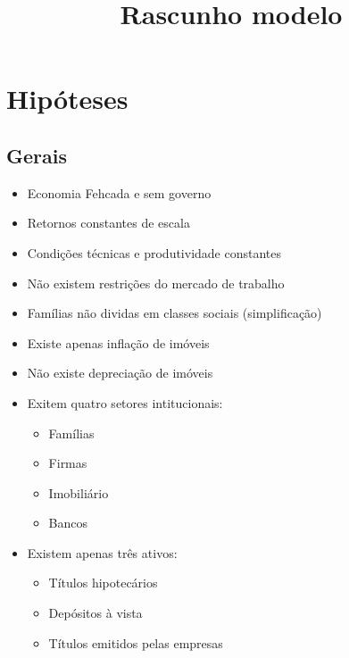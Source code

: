 \documentclass[11pt]{article}
\title{Rascunho modelo}
\providecommand{\tightlist}{%
      \setlength{\itemsep}{0pt}\setlength{\parskip}{0pt}}
\begin{document}
    
    
    \maketitle
    
    

    
    \hypertarget{hipuxf3teses}{%
\section{Hipóteses}\label{hipuxf3teses}}

    \hypertarget{gerais}{%
\subsection{Gerais}\label{gerais}}

\begin{itemize}
\tightlist
\item
  Economia Fehcada e sem governo
\item
  Retornos constantes de escala
\item
  Condições técnicas e produtividade constantes
\item
  Não existem restrições do mercado de trabalho
\item
  Famílias não dividas em classes sociais (simplificação)
\item
  Existe apenas inflação de imóveis
\item
  Não existe depreciação de imóveis
\item
  Exitem quatro setores intitucionais:

  \begin{itemize}
  \tightlist
  \item
    Famílias
  \item
    Firmas
  \item
    Imobiliário
  \item
    Bancos
  \end{itemize}
\item
  Existem apenas três ativos:

  \begin{itemize}
  \tightlist
  \item
    Títulos hipotecários
  \item
    Depósitos à vista
  \item
    Títulos emitidos pelas empresas
  \end{itemize}
\end{itemize}
\end{document}
